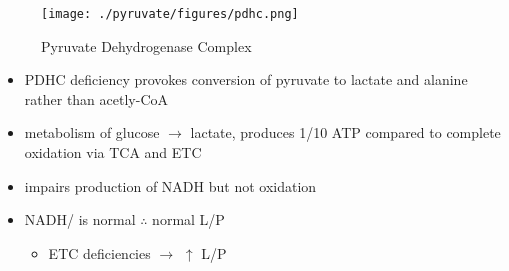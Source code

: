 \documentclass{scrartcl}
\begin{document}
\begin{figure}[htbp]
\centering
\texttt{[image: ./pyruvate/figures/pdhc.png]}
\caption[pdhc]{\label{fig:org607a7d6}
Pyruvate Dehydrogenase Complex}
\end{figure}

\begin{itemize}
\item PDHC deficiency provokes conversion of pyruvate to lactate and alanine rather than acetly-CoA
\item metabolism of glucose \(\to\) lactate, produces 1/10 ATP compared to
complete oxidation via TCA and ETC
\item impairs production of NADH but not oxidation
\item NADH/ is normal \(\therefore\) normal L/P
\begin{itemize}
\item ETC deficiencies \(\to\) \(\uparrow\) L/P
\end{itemize}
\end{itemize}
\end{document}
